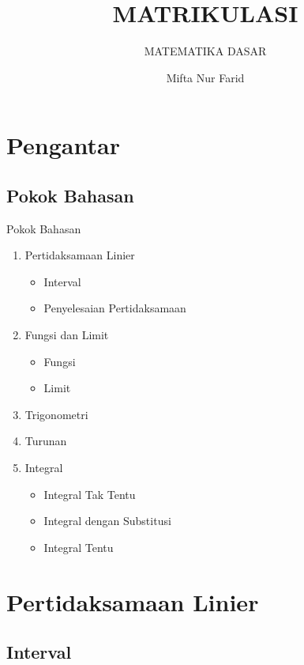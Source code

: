 \documentclass[pdflatex,compress,mathserif]{beamer}
\title{MATRIKULASI}
\subtitle{MATEMATIKA DASAR}
\author{Mifta Nur Farid}
\begin{document}
\maketitle

\section{Pengantar}

	\subsection{Pokok Bahasan}
		\begin{frame}{Pokok Bahasan}
			\begin{multicols}{2}
				\begin{enumerate}
					\item Pertidaksamaan Linier
					\begin{itemize}
						\item Interval
						\item Penyelesaian Pertidaksamaan
					\end{itemize}
					\item Fungsi dan Limit
					\begin{itemize}
						\item Fungsi
						\item Limit
					\end{itemize}
					\item Trigonometri
					\item Turunan
					\item Integral
					\begin{itemize}
						\item Integral Tak Tentu
						\item Integral dengan Substitusi
						\item Integral Tentu
					\end{itemize}
				\end{enumerate}
			\end{multicols}
		\end{frame}

\section{Pertidaksamaan Linier}

	\subsection{Interval}
\end{document}
